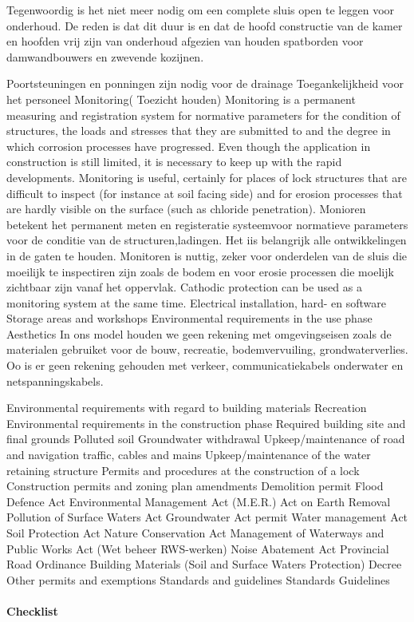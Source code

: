 Tegenwoordig is het niet meer nodig om een complete sluis open te leggen voor onderhoud. De reden is dat dit duur is en dat de hoofd constructie van de kamer en hoofden  vrij zijn van onderhoud afgezien van houden spatborden voor damwandbouwers en zwevende kozijnen.

Poortsteuningen en ponningen zijn nodig voor de drainage
Toegankelijkheid voor het personeel
Monitoring( Toezicht houden)
Monitoring is a permanent measuring and registration system for normative parameters for the condition
of structures, the loads and stresses that they are submitted to and the degree in which corrosion
processes have progressed. Even though the application in construction is still limited, it is necessary to
keep up with the rapid developments. Monitoring is useful, certainly for places of lock structures that are
difficult to inspect (for instance at soil facing side) and for erosion processes that are hardly visible on the
surface (such as chloride penetration).
Monioren betekent het permanent meten en registeratie systeemvoor normatieve parameters voor de conditie van de structuren,ladingen. Het iis belangrijk alle ontwikkelingen in de gaten te houden. Monitoren is nuttig, zeker voor onderdelen van de sluis die moeilijk te inspectiren zijn zoals de bodem en voor erosie processen die moelijk zichtbaar zijn vanaf het oppervlak.
Cathodic protection can be used as a monitoring system at the same time.
Electrical installation, hard- en software
Storage areas and workshops
Environmental requirements in the use phase
Aesthetics
\newline \indent In ons model houden we geen rekening met omgevingseisen zoals de materialen gebruiket voor de bouw, recreatie, bodemvervuiling, grondwaterverlies. Oo is er geen rekening gehouden met verkeer, communicatiekabels onderwater en netspanningskabels.

Environmental requirements with regard to building materials
Recreation
Environmental requirements in the construction phase
Required building site and final grounds
Polluted soil
Groundwater withdrawal
Upkeep/maintenance of road and navigation traffic, cables and mains
Upkeep/maintenance of the water retaining structure
\newline \indent Permits and procedures at the construction of a lock
Construction permits and zoning plan amendments
Demolition permit
Flood Defence Act
Environmental Management Act (M.E.R.)
Act on Earth Removal
Pollution of Surface Waters Act
Groundwater Act permit
Water management Act
Soil Protection Act
Nature Conservation Act
Management of Waterways and Public Works Act (Wet beheer RWS-werken)
Noise Abatement Act
Provincial Road Ordinance
Building Materials (Soil and Surface Waters Protection) Decree
Other permits and exemptions
Standards and guidelines
Standards
Guidelines
\paragraph{Checklist}
